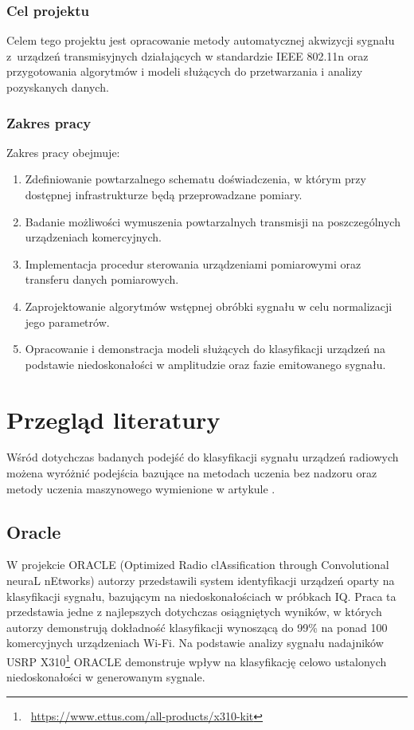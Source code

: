 \subsubsection*{Cel projektu}

Celem tego projektu jest opracowanie metody automatycznej akwizycji sygnału z~urządzeń transmisyjnych działających w standardzie IEEE 802.11n oraz przygotowania algorytmów i modeli służących do przetwarzania i analizy pozyskanych danych.

\subsubsection*{Zakres pracy}

Zakres pracy obejmuje:
\begin{enumerate}
    \item Zdefiniowanie powtarzalnego schematu doświadczenia, w którym przy dostępnej infrastrukturze będą przeprowadzane pomiary.
    \item Badanie możliwości wymuszenia powtarzalnych transmisji na poszczególnych urządzeniach komercyjnych.
    \item Implementacja procedur sterowania urządzeniami pomiarowymi oraz transferu danych pomiarowych.
    \item Zaprojektowanie algorytmów wstępnej obróbki sygnału w celu  normalizacji jego parametrów.
    \item Opracowanie i demonstracja modeli służących do klasyfikacji urządzeń na podstawie niedoskonałości w amplitudzie oraz fazie emitowanego sygnału.
\end{enumerate}


\section{Przegląd literatury}
Wśród dotychczas badanych podejść do klasyfikacji sygnału urządzeń radiowych możena wyróżnić podejścia bazujące na metodach uczenia bez nadzoru oraz metody uczenia maszynowego wymienione w artykule \cite{rf_fingerprinting_sciencedirect}.
\subsection{Oracle}
W projekcie ORACLE (Optimized Radio clAssification through Convolutional neuraL
nEtworks) \cite{sankhe2019oracle} autorzy przedstawili system identyfikacji urządzeń oparty na klasyfikacji sygnału, bazującym na niedoskonałościach w próbkach IQ. Praca ta przedstawia jedne z najlepszych dotychczas osiągniętych wyników, w których autorzy demonstrują dokładność klasyfikacji wynoszącą do 99\% na ponad 100 komercyjnych urządzeniach Wi-Fi. Na podstawie analizy sygnału nadajników USRP X310\footnote{~\url{https://www.ettus.com/all-products/x310-kit}} ORACLE demonstruje wpływ na klasyfikację celowo ustalonych niedoskonałości w generowanym sygnale.

